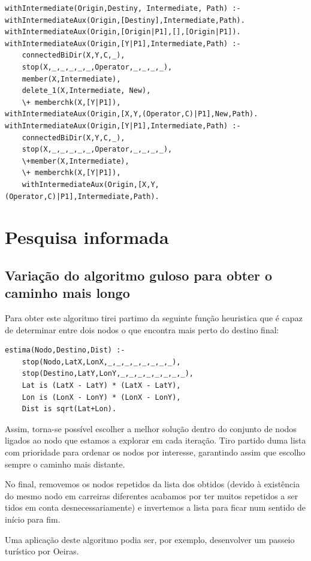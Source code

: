 \documentclass[20pt]{article}
\begin{document}
\begin{verbatim}
withIntermediate(Origin,Destiny, Intermediate, Path) :-
withIntermediateAux(Origin,[Destiny],Intermediate,Path).
withIntermediateAux(Origin,[Origin|P1],[],[Origin|P1]).
withIntermediateAux(Origin,[Y|P1],Intermediate,Path) :- 
    connectedBiDir(X,Y,C,_),
    stop(X,_,_,_,_,_,Operator,_,_,_,_),
    member(X,Intermediate),
    delete_1(X,Intermediate, New),
    \+ memberchk(X,[Y|P1]), 
withIntermediateAux(Origin,[X,Y,(Operator,C)|P1],New,Path).     
withIntermediateAux(Origin,[Y|P1],Intermediate,Path) :- 
    connectedBiDir(X,Y,C,_),
    stop(X,_,_,_,_,_,Operator,_,_,_,_),
    \+member(X,Intermediate),
    \+ memberchk(X,[Y|P1]), 
    withIntermediateAux(Origin,[X,Y,(Operator,C)|P1],Intermediate,Path).    
\end{verbatim}

\newpage
\section{Pesquisa informada}
\subsection{Variação do algoritmo guloso para obter o caminho mais longo}
Para obter este algoritmo tirei partimo da seguinte função heuristica que é capaz de determinar entre dois nodos o que encontra mais perto do destino final:
\begin{verbatim}
estima(Nodo,Destino,Dist) :- 
    stop(Nodo,LatX,LonX,_,_,_,_,_,_,_,_),
    stop(Destino,LatY,LonY,_,_,_,_,_,_,_,_),
    Lat is (LatX - LatY) * (LatX - LatY), 
    Lon is (LonX - LonY) * (LonX - LonY), 
    Dist is sqrt(Lat+Lon).
\end{verbatim}

Assim, torna-se possível escolher a melhor solução dentro do conjunto de nodos ligados ao nodo que estamos a explorar em cada iteração. Tiro partido duma lista com prioridade para ordenar os nodos por interesse, garantindo assim que escolho sempre o caminho mais distante.

No final, removemos os nodos repetidos da lista dos obtidos (devido à existência do mesmo nodo em carreiras diferentes acabamos por ter muitos repetidos a ser tidos em conta desnecessariamente) e invertemos a lista para ficar num sentido de início para fim.

Uma aplicação deste algoritmo podia ser, por exemplo, desenvolver um passeio turístico por Oeiras.
\end{document}
